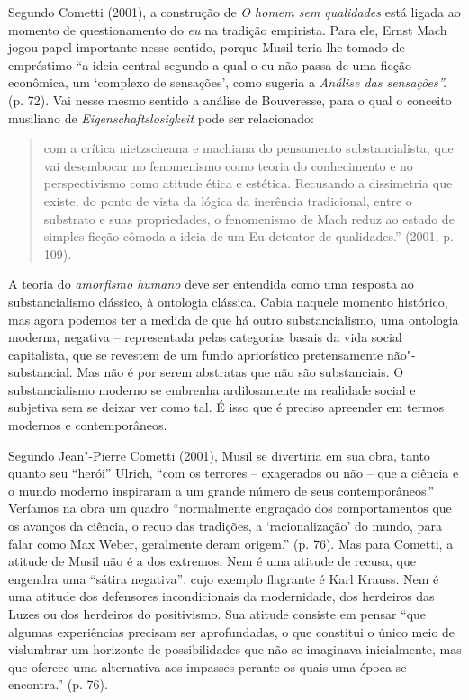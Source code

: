 Segundo Cometti (2001), a construção de \emph{O homem sem qualidades}
está ligada ao momento de questionamento do \emph{eu} na tradição
empirista. Para ele, Ernst Mach jogou papel importante nesse sentido,
porque Musil teria lhe tomado de empréstimo ``a ideia central segundo a
qual o eu não passa de uma ficção econômica, um `complexo de sensações',
como sugeria a \emph{Análise das sensações''.} (p. 72). Vai nesse mesmo
sentido a análise de Bouveresse, para o qual o conceito musiliano de
\emph{Eigenschaftslosigkeit} pode ser relacionado:

\begin{quote}
com a crítica nietzscheana e machiana do pensamento substancialista, que
vai desembocar no fenomenismo como teoria do conhecimento e no
perspectivismo como atitude ética e estética. Recusando a dissimetria
que existe, do ponto de vista da lógica da inerência tradicional, entre
o substrato e suas propriedades, o fenomenismo de Mach reduz ao estado
de simples ficção cômoda a ideia de um Eu detentor de qualidades.''
(2001, p. 109).
\end{quote}

A teoria do \emph{amorfismo humano} deve ser entendida como uma resposta
ao substancialismo clássico, à ontologia clássica. Cabia naquele momento
histórico, mas agora podemos ter a medida de que há outro
substancialismo, uma ontologia moderna, negativa -- representada pelas
categorias basais da vida social capitalista, que se revestem de um
fundo apriorístico pretensamente não"-substancial. Mas não é por serem
abstratas que não são substanciais. O substancialismo moderno se
embrenha ardilosamente na realidade social e subjetiva sem se deixar ver
como tal. É isso que é preciso apreender em termos modernos e
contemporâneos.

Segundo Jean"-Pierre Cometti (2001), Musil se divertiria em sua obra,
tanto quanto seu ``herói'' Ulrich, ``com os terrores -- exagerados ou
não -- que a ciência e o mundo moderno inspiraram a um grande número de
seus contemporâneos.'' Veríamos na obra um quadro ``normalmente
engraçado dos comportamentos que os avanços da ciência, o recuo das
tradições, a `racionalização' do mundo, para falar como Max Weber,
geralmente deram origem.'' (p. 76). Mas para Cometti, a atitude de Musil
não é a dos extremos. Nem é uma atitude de recusa, que engendra uma
``sátira negativa'', cujo exemplo flagrante é Karl Krauss. Nem é uma
atitude dos defensores incondicionais da modernidade, dos herdeiros das
Luzes ou dos herdeiros do positivismo. Sua atitude consiste em pensar
``que algumas experiências precisam ser aprofundadas, o que constitui o
único meio de vislumbrar um horizonte de possibilidades que não se
imaginava inicialmente, mas que oferece uma alternativa aos impasses
perante os quais uma época se encontra.'' (p. 76).

